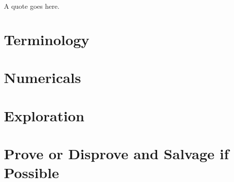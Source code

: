 \documentclass{homework}
\author{Jim Fowler}
\begin{document}
\maketitle

\begin{inspiration}
A quote goes here.
\end{inspiration}

\section{Terminology}

\section{Numericals}

\section{Exploration}

\section{Prove or Disprove and Salvage if Possible}
\end{document}
